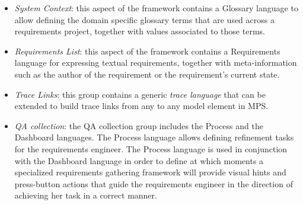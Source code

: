 \begin{itemize}
  \item \emph{System Context}: this aspect of the framework contains a
  \textsf{Glossary} language to allow defining the domain specific glossary
  terms that are used across a requirements project, together with values associated to those
  terms.
  \item \emph{Requirements List}: this aspect of the framework contains a
  \textsf{Requirements} language for expressing textual requirements, together with meta-information
  such as the author of the requirement or the requirement's current state.
  \item \emph{Trace Links}: this group contains a generic \emph{trace
  language} that can be extended to build trace links from any to any model
  element in MPS.
  \item \emph{QA collection}: the QA collection group includes the
  \textsf{Process} and the \textsf{Dashboard} languages. The \textsf{Process}
  language allows defining refinement tasks for the requirements engineer.
  The \textsf{Process} language is used in conjunction with the
  \textsf{Dashboard} language in order to define at which moments a specialized requirements
  gathering framework will provide visual hints and press-button actions that
  guide the requirements engineer in the direction of achieving her task in a
  correct manner.

\end{itemize}
\vspace{-.7cm}

